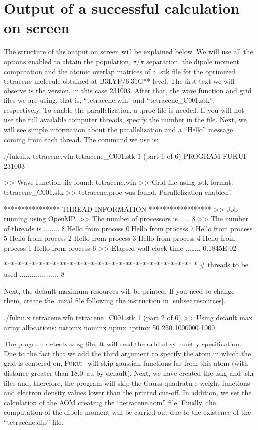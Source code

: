 \documentclass[a4paper,11pt,openany]{memoir}
\newcommand\versionprog{231003}
\newcommand\programa{\textsc{Fukui}}
\begin{document}
\section{Output of a successful calculation on screen}\label{sec:onscreen}
The structure of the output on screen will be explained below. We will use all the options enabled to obtain the population, $\sigma$/$\pi$ separation, the dipole moment computation and the atomic overlap matrices of a .stk file for the optimized tetracene molecule obtained at \mbox{B3LYP/6-31G**} level. The first text we will observe is the version, in this case \versionprog. After that, the wave function and grid files we are using, that is, ``tetracene.wfn'' and ``tetracene\_C001.stk'', respectively. To enable the parallelization, a .proc file is needed. If you will not use the full available computer threads, specify the number in the file. Next, we will see simple information about the parallelization and a ``Hello'' message coming from each thread. The command we use is:
\begin{consola}{./fukui.x tetracene.wfn tetracene\_C001.stk 1 (part 1 of 6)}
PROGRAM FUKUI 231003


>> Wave function file found: tetracene.wfn
>> Grid file using .stk format: tetracene_C001.stk
>> tetracene.proc was found. Parallelization enabled!!

**************** THREAD INFORMATION ******************
>> Job running using OpenMP.
>> The number of processors is .....   8
>> The number of threads is ........   8
Hello from process       0
Hello from process       7
Hello from process       5
Hello from process       2
Hello from process       3
Hello from process       4
Hello from process       1
Hello from process       6
>> Elapsed wall clock time ........ 0.1845E-02

******************************************************
* # threads to be used .................... 8
\end{consola}
Next, the default maximum resources will be printed. If you need to change them, create the .mxal file following the instruction in \autoref{subsec:resources}.
\begin{consola}{./fukui.x tetracene.wfn tetracene\_C001.stk 1 (part 2 of 6)}
>> Using default max array allocations:
natomx     nommx      npmx    nprimx
50       250   1000000      1000
\end{consola}
The program detects a .sg file. It will read the orbital symmetry specification. Due to the fact that we add the third argument to specify the atom in which the grid is centered on, \programa~ will skip gaussian functions far from this atom (with distance greater than \SI{18.0}{au} by default). Next, we have created the .skg and .skr files and, therefore, the program will skip the Gauss quadrature weight functions and electron density values lower than the printed cut-off. In addition, we set the calculation of the \ac{AOM} creating the ``tetracene.aom'' file. Finally, the computation of the dipole moment will be carried out due to the existence of the ``tetracene.dip'' file.
\end{document}
